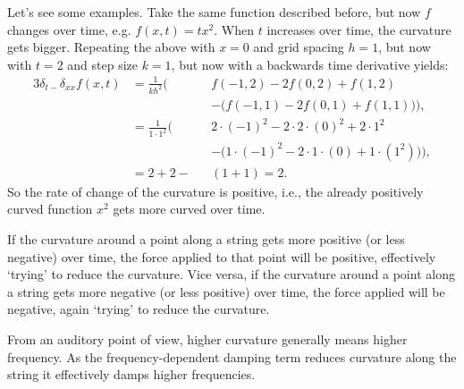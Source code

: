 Let's see some examples. Take the same function described before, but now $f$ changes over time, e.g. $f(x, t)=tx^2$. When $t$ increases over time, the curvature gets bigger. Repeating the above with $x=0$ and grid spacing $h = 1$, but now with $t=2$ and step size $k=1$, but now with a backwards time derivative yields:
  \begin{alignat*}{3}
    \delta_{t-}\delta_{xx}f(x,t) &= \frac{1}{kh^2}\bigg(&&f(-1, 2) - 2f(0, 2) + f(1, 2) \\
    & &&- \Big(f(-1, 1) - 2f(0, 1) + f(1, 1)\Big)\bigg),\\
    & = \frac{1}{1\cdot 1^2}\bigg(&&2\cdot(-1)^2-2\cdot2\cdot(0)^2+2\cdot1^2\\
    & &&-\Big(1\cdot(-1)^2-2\cdot1\cdot(0)+1\cdot(1^2)\Big)\Bigg),\\
    &=2+2-&&(1+1)=2.
  \end{alignat*}
So the rate of change of the curvature is positive, i.e., the already positively curved function $x^2$ gets more curved over time.

If the curvature around a point along a string gets more positive (or less negative) over time, the force applied to that point will be positive, effectively `trying' to reduce the curvature. Vice versa, if the curvature around a point along a string gets more negative (or less positive) over time, the force applied will be negative, again `trying' to reduce the curvature. 

From an auditory point of view, higher curvature generally means higher frequency. As the frequency-dependent damping term reduces curvature along the string it effectively damps higher frequencies.
 
